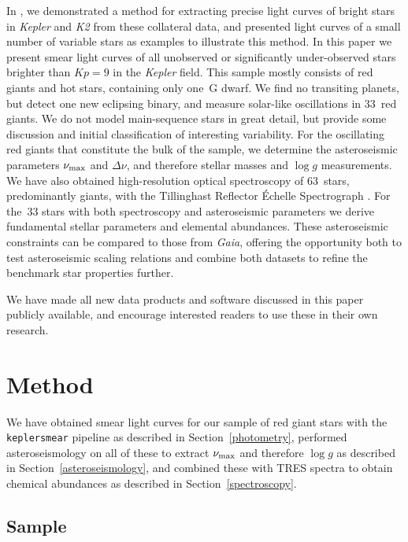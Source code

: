 \documentclass[a4paper,fleqn,usenatbib]{mnras}
\newcommand{\numax}{\mbox{$\nu_{\rm max}$}\xspace}
\newcommand{\Dnu}{\mbox{$\Delta \nu$}\xspace}
\newcommand{\logg}{\mbox{$\log g$}\xspace}
\newcommand{\kepler}{\textit{Kepler}\xspace}
\newcommand{\ktwo}{\textit{K2}\xspace}
\newcommand{\gaia}{\textit{Gaia}\xspace}
\begin{document}
In \citet{smear}, we demonstrated a method for extracting precise light curves of bright stars in \kepler and \ktwo from these collateral data, and presented light curves of a small number of variable stars as examples to illustrate this method. In this paper we present smear light curves of all unobserved or significantly under-observed stars brighter than $Kp=9$ in the \kepler field. This sample mostly consists of red giants and hot stars, containing only one~G dwarf. We find no transiting planets, but detect one new eclipsing binary, and measure solar-like oscillations in 33~red giants. We do not model main-sequence stars in great detail, but provide some discussion and initial classification of interesting variability. For the oscillating red giants that constitute the bulk of the sample, we determine the asteroseismic parameters \numax and \Dnu, and therefore stellar masses and \logg measurements. We have also obtained high-resolution optical spectroscopy of 63~stars, predominantly giants, with the Tillinghast Reflector \'{E}chelle Spectrograph \citep[TRES;][]{2007RMxAC..28..129S}. For the~33 stars with both spectroscopy and asteroseismic parameters we derive fundamental stellar parameters and elemental abundances. These asteroseismic constraints can be compared to those from \gaia, offering the opportunity both to test asteroseismic scaling relations and combine both datasets to refine the benchmark star properties further.

We have made all new data products and software discussed in this paper publicly available, and encourage interested readers to use these in their own research.   

\section{Method}
\label{method}

We have obtained smear light curves for our sample of red giant stars with the \texttt{keplersmear} pipeline as described in Section~\ref{photometry}, performed asteroseismology on all of these to extract \numax and therefore \logg as described in Section~\ref{asteroseismology}, and combined these with TRES spectra to obtain chemical abundances as described in Section~\ref{spectroscopy}. 

\subsection{Sample}
\label{sample}
\end{document}
